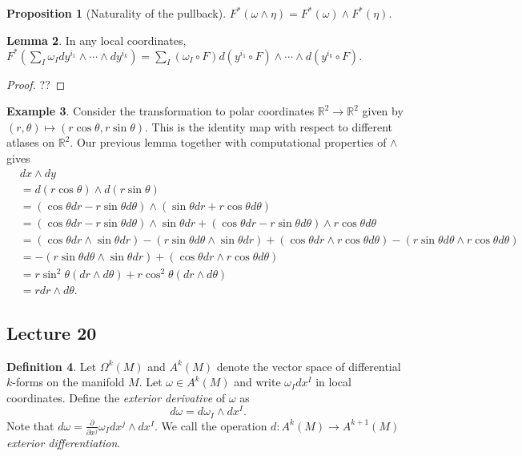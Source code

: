 \documentclass[10pt,letterpaper,cm]{nupset}
\theoremstyle{definition}
\newtheorem{definition}{Definition}[subsection]
\newtheorem{exmp}[definition]{Example}
\theoremstyle{theorem}
\newtheorem{lemma}[definition]{Lemma}
\newtheorem{prop}[definition]{Proposition}
\theoremstyle{remark}
\newcommand{\R}{\mathbb R}
\newcommand{\1}{\mathbf{1}}
\newcommand{\0}{\vec 0}
\begin{document}
\begin{prop}[Naturality of the pullback]
$F^{\ast}(\omega \wedge \eta) = F^{\ast}(\omega) \wedge F^{\ast}(\eta).$
\end{prop}

\begin{lemma}
In any local coordinates, $F^{\ast}(\sum_I \omega_I dy^{i_1} \wedge \cdots \wedge dy^{i_k}) = \sum_I (\omega_I \circ F)d(y^{i_1} \circ F) \wedge \cdots \wedge d(y^{i_k} \circ F).$
\end{lemma}
\begin{proof}
??
\end{proof}

\begin{exmp}
Consider the transformation to polar coordinates $\R^2 \to \R^2$ given by $(r, \theta) \mapsto (r\cos \theta, r\sin \theta)$. This is the identity map with respect to different atlases on $\R^2$. Our previous lemma together with computational properties of $\wedge$ gives
\begin{align*} & dx \wedge dy \\ & = d(r\cos \theta) \wedge d(r\sin \theta) \\ &=   (\cos \theta dr - r\sin \theta d\theta) \wedge (\sin \theta dr +r \cos \theta d\theta) \\ &= (\cos \theta dr - r\sin \theta d\theta) \wedge \sin \theta dr + (\cos \theta dr - r\sin \theta d\theta) \wedge r \cos \theta d\theta \\ & = (\cos \theta dr \wedge \sin \theta dr) - (r \sin \theta d \theta \wedge \sin \theta dr) +  (\cos \theta dr \wedge r \cos \theta d\theta) - (r\sin \theta d \theta \wedge r \cos \theta d \theta)\\ & =  - (r \sin \theta d \theta \wedge \sin \theta dr) +  (\cos \theta dr \wedge r \cos \theta d\theta) \\ & = r\sin^2\theta(dr \wedge d\theta) + r\cos^2 \theta(dr \wedge d\theta)\\ & = rdr \wedge d\theta.
\end{align*}
\end{exmp}

\subsection{Lecture 20}

\begin{definition}
Let $\Omega^k(M)$ and $A^k(M)$ denote the vector space of differential $k$-forms on the manifold $M$. 
Let $\omega \in A^k(M)$ and write $\omega_I dx^I$ in local coordinates. Define the \textit{exterior derivative} of $\omega$ as $$d\omega = d \omega_I \wedge dx^I.$$ Note that $d \omega = \frac{\partial}{\partial{x^j}}\omega_I dx^j \wedge dx^I.$ We call the operation $d : A^k(M) \to A^{k+1}(M)$ \textit{exterior differentiation}.
\end{definition}
\end{document}

